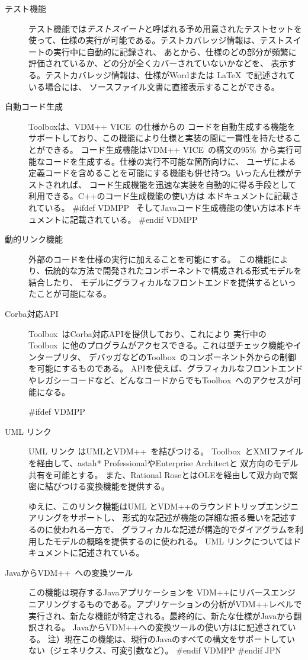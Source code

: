 \documentclass[\pformat,12pt]{article}
\def\vdmpp{{\small VDM}++}
\newcommand{\vdmslpp}{VDM-SL}
\newcommand{\Toolbox}{Toolbox}
\newcommand{\vdmslpp}{VDM++}
\newcommand{\Toolbox}{Toolbox}
\renewcommand{\vdmslpp}{VDM++ VICE}
\begin{document}
\begin{description}
\item[テスト機能] テスト機能では{\em テストスイート\/}と呼ばれる予め用意されたテストセットを
使って、仕様の実行が可能である。テストカバレッジ情報は、テストスイートの実行中に自動的に記録され、
あとから、仕様のどの部分が頻繁に評価されているか、どの分が全くカバーされていないかなどを、
表示する。テストカバレッジ情報は、仕様がWordまたは \LaTeX\ で記述されている場合には、
ソースファイル文書に直接表示することができる。

\item[自動コード生成] Toolboxは、\vdmslpp\ の仕様からの
コードを自動生成する機能をサポートしており、この機能により仕様と実装の間に一貫性を持たせることができる。
コード生成機能は\vdmslpp\ の構文の95\%\ から実行可能なコードを生成する。仕様の実行不可能な箇所向けに、
ユーザによる定義コードを含めることを可能にする機能も併せ持つ。いったん仕様がテストされれば、
コード生成機能を迅速な実装を自動的に得る手段として利用できる。C++のコード生成機能の使い方は
本ドキュメントに記載されている。
#ifdef VDMPP
\ そしてJavaコード生成機能の使い方は本ドキュメント\cite{CGJavaManPP-SCSK}に記載されている。
#endif VDMPP

\item[動的リンク機能] 外部のコードを仕様の実行に加えることを可能にする。
この機能により、伝統的な方法で開発されたコンポーネントで構成される形式モデルを結合したり、
モデルにグラフィカルなフロントエンドを提供するといったことが可能になる。

\item[Corba対応API] \Toolbox\ はCorba対応APIを提供しており、これにより
実行中の\Toolbox\ に他のプログラムがアクセスできる。これは型チェック機能やインタープリタ、
デバッガなどの\Toolbox\ のコンポーネント外からの制御を可能にするものである。
APIを使えば、グラフィカルなフロントエンドやレガシーコードなど、どんなコードからでも\Toolbox\ 
へのアクセスが可能になる。

#ifdef VDMPP
\item[UML リンク] UML リンク はUMLと\vdmpp\ を結びつける。
\Toolbox\ とXMIファイルを経由して、astah* ProfessionalやEnterprise Architectと
双方向のモデル共有を可能とする。
また、Rational RoseとはOLEを経由して双方向で緊密に結びつける変換機能を提供する。

ゆえに、このリンク機能はUML と\vdmpp のラウンドトリップエンジニアリングをサポートし、
形式的な記述が機能の詳細な振る舞いを記述するのに使われる一方で、
グラフィカルな記述が構造的でダイアグラムを利用したモデルの概略を提供するのに使われる。
UML リンクについてはドキュメント\cite{UMLMan-SCSK}に記述されている。

\item[Javaから\vdmpp\ への変換ツール] この機能は現存するJavaアプリケーションを
\vdmpp にリバースエンジニアリングするものである。アプリケーションの分析が\vdmpp レベルで
実行され、新たな機能が特定される。最終的に、新たな仕様がJavaから翻訳される。
Javaから\vdmpp への変換ツールの使い方は\cite{Java2VDMMan-SCSK}に記述されている。
注）現在この機能は、現行のJavaのすべての構文をサポートしていない（ジェネリクス、可変引数など）。
#endif VDMPP
#endif JPN

\end{description}
\end{document}
